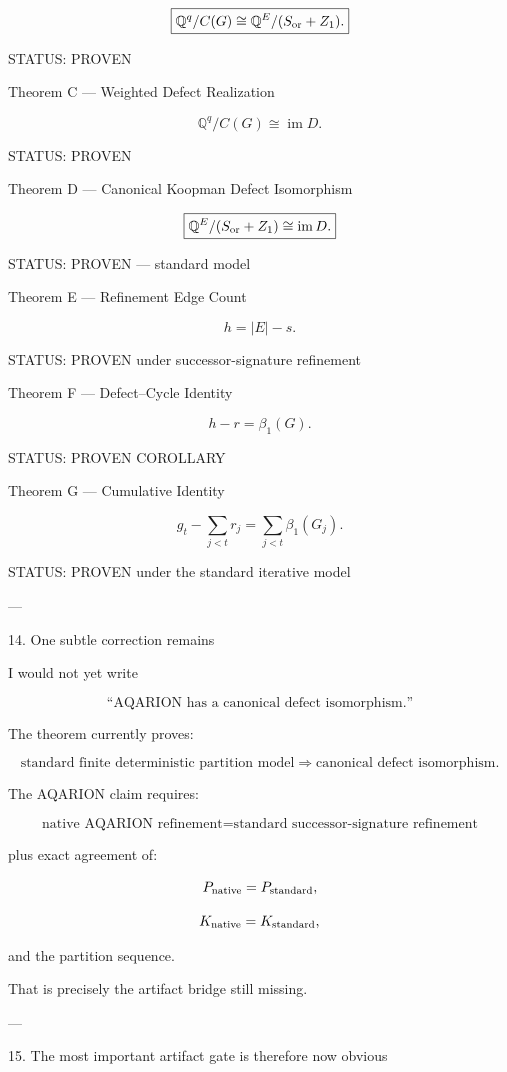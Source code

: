 \[
\boxed{
\mathbb Q^q/C(G)
\cong
\mathbb Q^E/(S_{\rm or}+Z_1).
}
\]

STATUS: PROVEN

Theorem C — Weighted Defect Realization

\[
\boxed{
\mathbb Q^q/C(G)
\cong
\operatorname{im}D.
}
\]

STATUS: PROVEN

Theorem D — Canonical Koopman Defect Isomorphism

\[
\boxed{
\mathbb Q^E/(S_{\rm or}+Z_1)
\cong
\operatorname{im}D.
}
\]

STATUS: PROVEN — standard model

Theorem E — Refinement Edge Count

\[
\boxed{
h=|E|-s.
}
\]

STATUS: PROVEN under successor-signature refinement

Theorem F — Defect–Cycle Identity

\[
\boxed{
h-r=\beta_1(G).
}
\]

STATUS: PROVEN COROLLARY

Theorem G — Cumulative Identity

\[
\boxed{
g_t-\sum_{j<t}r_j
=
\sum_{j<t}\beta_1(G_j).
}
\]

STATUS: PROVEN under the standard iterative model


---

14. One subtle correction remains

I would not yet write

\[
\text{“AQARION has a canonical defect isomorphism.”}
\]

The theorem currently proves:

\[
\boxed{
\text{standard finite deterministic partition model}
\Rightarrow
\text{canonical defect isomorphism}.
}
\]

The AQARION claim requires:

\[
\boxed{
\text{native AQARION refinement}
=
\text{standard successor-signature refinement}
}
\]

plus exact agreement of:

\[
P_{\rm native}=P_{\rm standard},
\]

\[
K_{\rm native}=K_{\rm standard},
\]

and the partition sequence.

That is precisely the artifact bridge still missing.


---

15. The most important artifact gate is therefore now obvious

